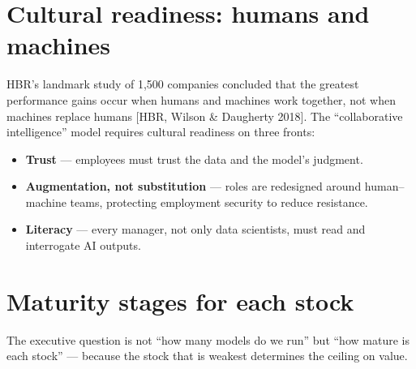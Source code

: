 \section{Cultural readiness: humans and machines}

HBR's landmark study of 1,500 companies concluded that the greatest performance
gains occur when humans and machines work together, not when machines replace
humans [HBR, Wilson \& Daugherty 2018]. The ``collaborative intelligence''
model requires cultural readiness on three fronts:
\begin{itemize}
  \item \textbf{Trust} — employees must trust the data and the model's judgment.
  \item \textbf{Augmentation, not substitution} — roles are redesigned around
        human--machine teams, protecting employment security to reduce
        resistance.
  \item \textbf{Literacy} — every manager, not only data scientists, must read
        and interrogate AI outputs.
\end{itemize}

\section{Maturity stages for each stock}

\begin{center}
  \renewcommand{\arraystretch}{1.45}
\end{center}

The executive question is not ``how many models do we run'' but ``how mature
is each stock'' — because the stock that is weakest determines the ceiling on
value.
